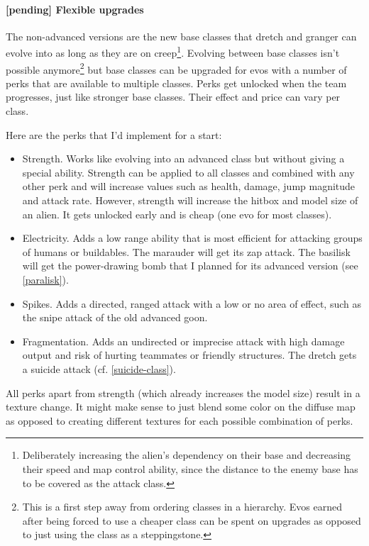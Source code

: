 \documentclass{scrartcl}
\newcommand{\pending}  [0]{\textcolor{pending}  {\textbf{[pending] }}}
\begin{document}
\paragraph{\pending Flexible upgrades}
\label{flexible-upgrades}

The non-advanced versions are the new base classes that dretch and granger can evolve into as long as they are on creep\footnote{Deliberately increasing the alien's dependency on their base and decreasing their speed and map control ability, since the distance to the enemy base has to be covered as the attack class.}. Evolving between base classes isn't possible anymore\footnote{This is a first step away from ordering classes in a hierarchy. Evos earned after being forced to use a cheaper class can be spent on upgrades as opposed to just using the class as a steppingstone.} but base classes can be upgraded for evos with a number of perks that are available to multiple classes. Perks get unlocked when the team progresses, just like stronger base classes. Their effect and price can vary per class.

Here are the perks that I'd implement for a start:

\begin{itemize}
\item Strength. Works like evolving into an advanced class but without giving a special ability. Strength can be applied to all classes and combined with any other perk and will increase values such as health, damage, jump magnitude and attack rate. However, strength will increase the hitbox and model size of an alien. It gets unlocked early and is cheap (one evo for most classes).
\item Electricity. Adds a low range ability that is most efficient for attacking groups of humans or buildables. The marauder will get its zap attack. The basilisk will get the power-drawing bomb that I planned for its advanced version (see \ref{paralisk}).
\item Spikes. Adds a directed, ranged attack with a low or no area of effect, such as the snipe attack of the old advanced goon.
\item Fragmentation. Adds an undirected or imprecise attack with high damage output and risk of hurting teammates or friendly structures. The dretch gets a suicide attack (cf. \ref{suicide-class}).
\end{itemize}

All perks apart from strength (which already increases the model size) result in a texture change. It might make sense to just blend some color on the diffuse map as opposed to creating different textures for each possible combination of perks.
\end{document}
